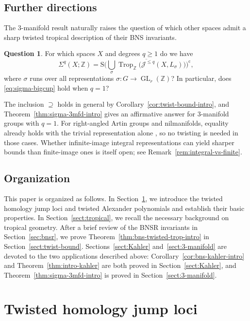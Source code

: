 \documentclass[11pt]{amsart}
\theoremstyle{definition}
\newtheorem{question}[theorem]{Question}
\newcommand{\Z}{\mathbb{Z}}
\newcommand{\cJ}{\mathcal{J}}
\newcommand{\rS}{\mathrm{S}}
\DeclareMathOperator{\GL}{GL}
\DeclareMathOperator{\Trop}{Trop}
\newcommand{\compl}{\mathrm{c}}
\begin{document}
\subsection{Further directions}
\label{intro:further}

The $3$-manifold result naturally raises the question of which
other spaces admit a sharp twisted tropical description of
their BNS invariants.

\begin{question}
\label{que:sigma}
For which spaces $X$ and degrees $q\geq 1$ do we have
\begin{equation}
\label{eq:sigma-bigcup}
\Sigma^q(X;\Z) = \rS\bigg(\overline{\bigcup_{\sigma}
\Trop_\Z\big(\cJ^{\le q}(X, L_{\sigma})\big)}\bigg)^{\compl},
\end{equation}
where $\sigma$ runs over all representations
$\sigma\colon G \to \GL_r(\Z)$?
In particular, does \eqref{eq:sigma-bigcup} hold when $q=1$?
\end{question}

The inclusion $\supseteq$ holds in general by
Corollary~\ref{cor:twist-bound-intro}, and
Theorem~\ref{thm:sigma-3mfd-intro} gives an affirmative
answer for $3$-manifold groups with $q=1$.  For right-angled
Artin groups and nilmanifolds, equality already holds with the
trivial representation alone \cite{PS-plms}, so no twisting is
needed in those cases.  Whether infinite-image integral
representations can yield sharper bounds than finite-image ones
is itself open; see Remark~\ref{rem:integral-vs-finite}.

\subsection{Organization}
\label{intro:organization}
This paper is organized as follows. In Section~\ref{sect:twist-cjl},
we introduce the twisted homology jump loci and twisted Alexander
polynomials and establish their basic properties.
In Section~\ref{sect:tropical}, we recall the necessary background
on tropical geometry.
After a brief review of the BNSR invariants in Section~\ref{sec:bnsr},
we prove Theorem~\ref{thm:bns-twisted-trop-intro}
in Section~\ref{sect:twist-bound}.
Sections~\ref{sect:Kahler} and~\ref{sect:3-manifold} are devoted
to the two applications described above:
Corollary~\ref{cor:bns-kahler-intro} and Theorem~\ref{thm:intro-kahler}
are both proved in Section~\ref{sect:Kahler}, and
Theorem~\ref{thm:sigma-3mfd-intro} is proved in
Section~\ref{sect:3-manifold}.

\section{Twisted homology jump loci}
\label{sect:twist-cjl}
\end{document}
